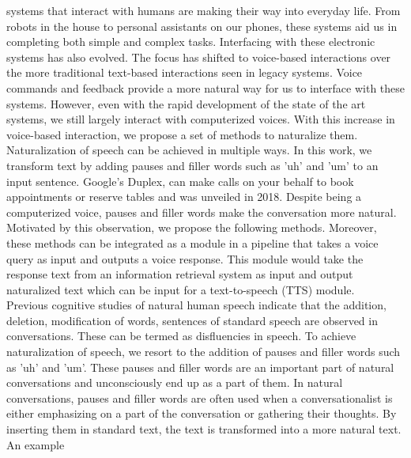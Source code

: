 \documentclass[journal]{IEEEtran}
\begin{document}
 systems that interact with humans are making their way into everyday life. From robots in the house to personal assistants on our phones, these systems aid us in completing both simple and complex tasks. Interfacing with these electronic systems has also evolved. The focus has shifted to voice-based interactions over the more traditional text-based interactions seen in legacy systems\cite{voice}. Voice commands and feedback provide a more natural way for us to interface with these systems. However, even with the rapid development of the state of the art systems, we still largely interact with computerized voices. With this increase in voice-based interaction, we propose a set of methods to naturalize them. Naturalization of speech can be achieved in multiple ways. In this work, we transform text by adding pauses and filler words such as 'uh' and 'um' to an input sentence. Google's Duplex\cite{duplex}, can make calls on your behalf to book appointments or reserve tables and was unveiled in 2018. Despite being a computerized voice, pauses and filler words make the conversation more natural. Motivated by this observation, we propose the following methods. Moreover, these methods can be integrated as a module in a pipeline that takes a voice query as input and outputs a voice response. This module would take the response text from an information retrieval system as input and output naturalized text which can be input for a text-to-speech (TTS) module. \\

Previous cognitive studies of natural human speech indicate that the addition, deletion, modification of words, sentences of standard speech are observed in conversations\cite{cognition}. These can be termed as disfluencies in speech. To achieve naturalization of speech, we resort to the addition of pauses and filler words such as 'uh' and 'um'. These pauses and filler words are an important part of natural conversations and unconsciously end up as a part of them. In natural conversations, pauses and filler words are often used when a conversationalist is either emphasizing on a part of the conversation or gathering their thoughts. By inserting them in standard text, the text is transformed into a more natural text. An example

\noindent{}
\\
\end{document}
